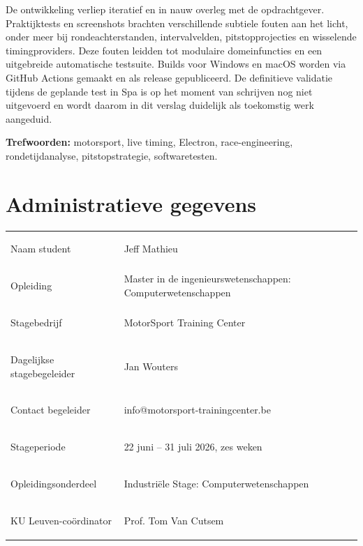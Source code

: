 De ontwikkeling verliep iteratief en in nauw overleg met de opdrachtgever. Praktijktests en screenshots brachten verschillende subtiele fouten aan het licht, onder meer bij rondeachterstanden, intervalvelden, pitstopprojecties en wisselende timingproviders. Deze fouten leidden tot modulaire domeinfuncties en een uitgebreide automatische testsuite. Builds voor Windows en macOS worden via GitHub Actions gemaakt en als release gepubliceerd. De definitieve validatie tijdens de geplande test in Spa is op het moment van schrijven nog niet uitgevoerd en wordt daarom in dit verslag duidelijk als toekomstig werk aangeduid.

\textbf{Trefwoorden:} motorsport, live timing, Electron, race-engineering, rondetijdanalyse, pitstopstrategie, softwaretesten.

\chapter*{Administratieve gegevens}
\begin{tabularx}{\textwidth}{>{\bfseries\raggedright\arraybackslash}p{5.5cm}X}
Naam student & Jeff Mathieu \\
Opleiding & Master in de ingenieurswetenschappen: Computerwetenschappen \\
Stagebedrijf & MotorSport Training Center \\
Dagelijkse stagebegeleider & Jan Wouters \\
Contact begeleider & info@motorsport-trainingcenter.be \\
Stageperiode & 22 juni -- 31 juli 2026, zes weken \\
Opleidingsonderdeel & Industriële Stage: Computerwetenschappen \\
KU Leuven-coördinator & Prof. Tom Van Cutsem \\
\end{tabularx}
